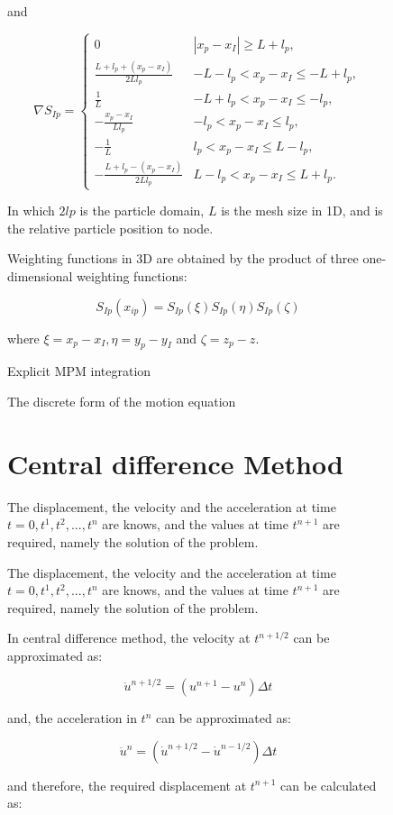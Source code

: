 \documentclass[11pt,a4paper]{article}
\begin{document}
\begin{figure}[h]
and

$$
\nabla S_{I p}= \begin{cases}0 & \left|x_p-x_I\right| \geqslant L+l_p, 
\\ \frac{L+l_p+\left(x_p-x_I\right)}{2 L l_p} & -L-l_p<x_p-x_I \leqslant-L+l_p, 
\\ \frac{1}{L} & -L+l_p<x_p-x_I \leqslant-l_p, 
\\ -\frac{x_p-x_I}{L l_p} & -l_p<x_p-x_I \leqslant l_p, 
\\ -\frac{1}{L} & l_p<x_p-x_I \leqslant L-l_p, \\ -\frac{L+l_p-\left(x_p-x_I\right)}{2 L l_p} & L-l_p<x_p-x_I \leqslant L+l_p .\end{cases}
$$

In which  $ 2lp  $ is the particle domain,  $ L  $ is the mesh size in 1D, and  is the relative particle position to node.

Weighting functions in 3D are obtained by the product of three one-dimensional weighting functions:

$$ S_{I p}(x_{i p}) = S_{I p}(\xi) S_{I p} (\eta) S_{I p} (\zeta) $$

where $ \xi=x_p-x_I, \eta=y_p-y_I  $ and  $ \zeta=z_p-z $.

Explicit MPM integration

The discrete form of the motion equation

\section{Central difference Method}

The displacement, the velocity and the acceleration at time  $ t = 0, t^1, t^2, ... , t^n  $ are knows, and the values at time  $ t^{n+1}  $ are required, namely the solution of the problem.

The displacement, the velocity and the acceleration at time  $ t = 0, t^1, t^2, ... , t^n  $ are knows, and the values at time  $ t^{n+1}  $ are required, namely the solution of the problem.

In central difference method, the velocity at  $ t^{n+1/2}  $ can be approximated as:

$$ \dot{u}^{n+1/2} = ( u^{n+1} - u^{n} ) \Delta t $$

and, the acceleration in  $ t^{n}  $ can be approximated as:

$$ \ddot{u}^{n} =  (\dot{u}^{n+1/2} - \dot u ^ {n-1/2})\Delta t $$

and therefore, the required displacement at  $ t^{n+1}  $ can be calculated as:


\end{figure}
\end{document}
